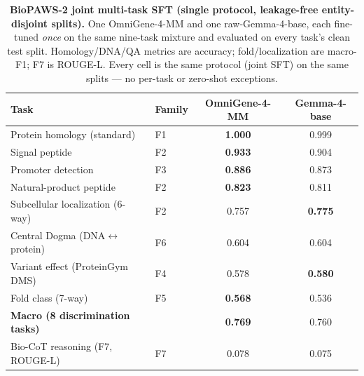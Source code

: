 \begin{table}[t]
\centering
\small
\caption{\textbf{BioPAWS-2 joint multi-task SFT (single protocol, leakage-free
entity-disjoint splits).} One OmniGene-4-MM and one raw-Gemma-4-base, each fine-tuned
\emph{once} on the same nine-task mixture and evaluated on every task's clean test split.
Homology/DNA/QA metrics are accuracy; fold/localization are macro-F1; F7 is ROUGE-L. Every
cell is the same protocol (joint SFT) on the same splits --- no per-task or zero-shot
exceptions.}
\label{tab:biopaws2_main}
\begin{tabular}{llcc}
\toprule
Task & Family & OmniGene-4-MM & Gemma-4-base \\
\midrule
Protein homology (standard)      & F1 & \textbf{1.000} & 0.999 \\
Signal peptide                   & F2 & \textbf{0.933} & 0.904 \\
Promoter detection               & F3 & \textbf{0.886} & 0.873 \\
Natural-product peptide          & F2 & \textbf{0.823} & 0.811 \\
Subcellular localization (6-way) & F2 & 0.757 & \textbf{0.775} \\
Central Dogma (DNA$\leftrightarrow$protein) & F6 & 0.604 & 0.604 \\
Variant effect (ProteinGym DMS)  & F4 & 0.578 & \textbf{0.580} \\
Fold class (7-way)               & F5 & \textbf{0.568} & 0.536 \\
\midrule
\textbf{Macro (8 discrimination tasks)} & & \textbf{0.769} & 0.760 \\
\midrule
Bio-CoT reasoning (F7, ROUGE-L)  & F7 & 0.078 & 0.075 \\
\bottomrule
\end{tabular}
\end{table}

